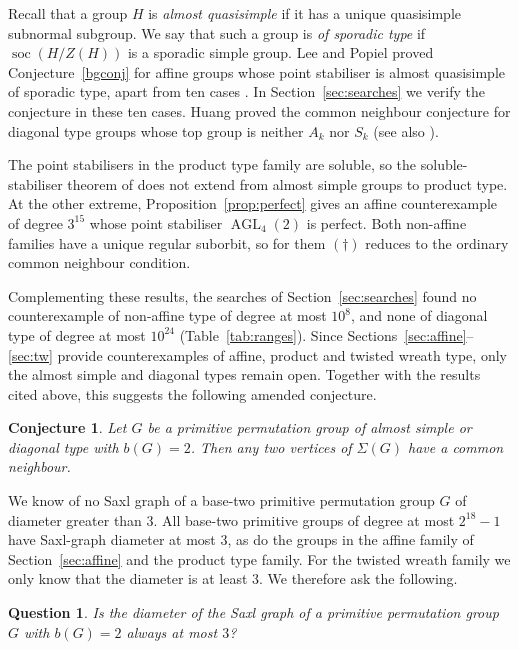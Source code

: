\documentclass[a4paper,reqno,11pt]{amsart}
\newcommand\AGL{\operatorname{AGL}}
\newtheorem{conj}[thm]{Conjecture}
\newtheorem{ques}[thm]{Question}
\numberwithin{equation}{section}
\begin{document}
Recall that a group $H$ is \emph{almost quasisimple} if it has a unique quasisimple subnormal subgroup. We say that such a group is \emph{of sporadic type} if $\operatorname{soc}(H/Z(H))$ is a sporadic simple group. Lee and Popiel proved Conjecture~\ref{bgconj} for affine groups whose point stabiliser is almost quasisimple of sporadic type, apart from ten cases \cite{LP}. In Section~\ref{sec:searches} we verify the conjecture in these ten cases. Huang proved the common neighbour conjecture for diagonal type groups whose top group is neither $A_k$ nor $S_k$ \cite[Theorem~5.6]{HuT} (see also \cite{Hu}).

The point stabilisers in the product type family are soluble, so the soluble-stabiliser theorem of \cite{BHs} does not extend from almost simple groups to product type. At the other extreme, Proposition~\ref{prop:perfect} gives an affine counterexample of degree $3^{15}$ whose point stabiliser $\AGL_4(2)$ is perfect. Both non-affine families have a unique regular suborbit, so for them $(\dagger)$ reduces to the ordinary common neighbour condition.

Complementing these results, the searches of Section~\ref{sec:searches} found no counterexample of non-affine type of degree at most $10^8$, and none of diagonal type of degree at most $10^{24}$ (Table~\ref{tab:ranges}). Since Sections~\ref{sec:affine}--\ref{sec:tw} provide counterexamples of affine, product and twisted wreath type, only the almost simple and diagonal types remain open. Together with the results cited above, this suggests the following amended conjecture.

\begin{conj}\label{ourconj}
Let $G$ be a primitive permutation group of almost simple or diagonal type with $b(G)=2$. Then any two vertices of $\Sigma(G)$ have a common neighbour.
\end{conj}

We know of no Saxl graph of a base-two primitive permutation group $G$ of diameter greater than $3$. All base-two primitive groups of degree at most $2^{18}-1$ have Saxl-graph diameter at most $3$, as do the groups in the affine family of Section~\ref{sec:affine} and the product type family. For the twisted wreath family we only know that the diameter is at least $3$. We therefore ask the following.

\begin{ques}\label{diamq}
Is the diameter of the Saxl graph of a primitive permutation group $G$ with $b(G)=2$ always at most $3$?
\end{ques}
\end{document}
